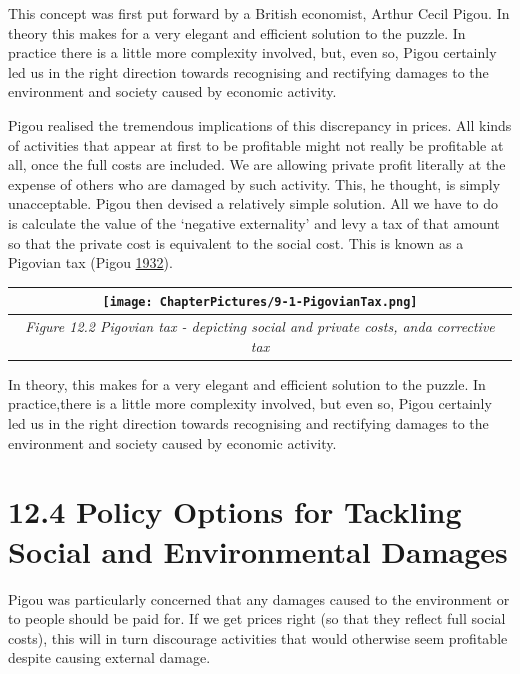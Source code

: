 \documentclass[]{tufte-handout}
\begin{document}
This concept was first put forward by a British economist, Arthur Cecil
Pigou. In theory this makes for a very elegant and efficient solution to
the puzzle. In practice there is a little more complexity involved, but,
even so, Pigou certainly led us in the right direction towards
recognising and rectifying damages to the environment and society caused
by economic activity.

Pigou realised the tremendous implications of this discrepancy in
prices. All kinds of activities that appear at first to be profitable
might not really be profitable at all, once the full costs are included.
We are allowing private profit literally at the expense of others who
are damaged by such activity. This, he thought, is simply unacceptable.
Pigou then devised a relatively simple solution. All we have to do is
calculate the value of the `negative externality' and levy a tax of that
amount so that the private cost is equivalent to the social cost. This
is known as a Pigovian tax (Pigou
\protect\hyperlink{ref-Pigou1932}{1932}).

\begin{longtable}[]{@{}c@{}}
\toprule
\begin{minipage}[b]{0.97\columnwidth}\centering
\texttt{[image: ChapterPictures/9-1-PigovianTax.png]}\strut
\end{minipage}\tabularnewline
\midrule
\endhead
\begin{minipage}[t]{0.97\columnwidth}\centering
\emph{Figure 12.2 Pigovian tax - depicting social and private costs,
anda corrective tax}\strut
\end{minipage}\tabularnewline
\bottomrule
\end{longtable}

In theory, this makes for a very elegant and efficient solution to the
puzzle. In practice,there is a little more complexity involved, but even
so, Pigou certainly led us in the right direction towards recognising
and rectifying damages to the environment and society caused by economic
activity.

\hypertarget{policy-options-for-tackling-social-and-environmental-damages}{%
\section{12.4 Policy Options for Tackling Social and Environmental
Damages}\label{policy-options-for-tackling-social-and-environmental-damages}}

Pigou was particularly concerned that any damages caused to the
environment or to people should be paid for. If we get prices right (so
that they reflect full social costs), this will in turn discourage
activities that would otherwise seem profitable despite causing external
damage.
\end{document}
